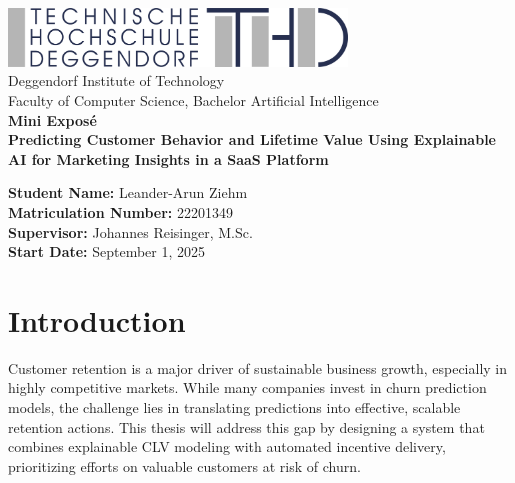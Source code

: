 \documentclass[12pt,a4paper]{article}
\newcommand{\university}{Deggendorf Institute of Technology}
\newcommand{\faculty}{Faculty of Computer Science, Bachelor Artificial Intelligence}
\newcommand{\papertitle}{Predicting Customer Behavior and Lifetime Value Using Explainable AI for Marketing Insights in a SaaS Platform}
\newcommand{\authorname}{Leander-Arun Ziehm}
\newcommand{\studentid}{22201349}
\newcommand{\supervisor}{Johannes Reisinger, M.Sc.}
\newcommand{\submissiondate}{September 1, 2025}
\begin{document}
\begin{titlepage}
  \centering
  \vfill

  \includegraphics[width=9cm]{THD_Logo.jpg}\\[1cm]

  {\Large \university}\\
  {\large \faculty}\\[1.5cm]

  {\LARGE \textbf{Mini Exposé}}\\[1cm]
  {\LARGE \textbf{\papertitle}}\\[1.5cm]

  \begin{flushleft}
    \textbf{Student Name:} \authorname\\
    \textbf{Matriculation Number:} \studentid\\
    \textbf{Supervisor:} \supervisor\\
    \textbf{Start Date:} \submissiondate
  \end{flushleft}

  \vfill
\end{titlepage}

\clearpage
{}

\begin{abstract}
Customer behavior prediction is a strategic advantage for SaaS companies seeking to optimize growth, retention, and revenue. This thesis proposes the development of an explainable AI system to predict Customer Lifetime Value (CLV), likelihood of converting from trial to paid, and risk of churn from paid subscriptions. By integrating classical statistical models with machine learning and explainability techniques (e.g., SHAP values), the system will provide transparent and actionable insights for marketing and product teams. A key outcome of the project is an interactive dashboard that visualizes individual and segment-level predictions, enabling data-driven decision-making without relying on opaque black-box models or automated outreach. The system will utilize real customer data, while adhering to data protection regulations, and aims to create a replicable framework for AI-driven marketing analytics in B2B SaaS contexts.
\end{abstract}

\section{Introduction}
Customer retention is a major driver of sustainable business growth, especially in highly competitive markets. While many companies invest in churn prediction models, the challenge lies in translating predictions into effective, scalable retention actions. This thesis will address this gap by designing a system that combines explainable CLV modeling with automated incentive delivery, prioritizing efforts on valuable customers at risk of churn.
\end{document}
